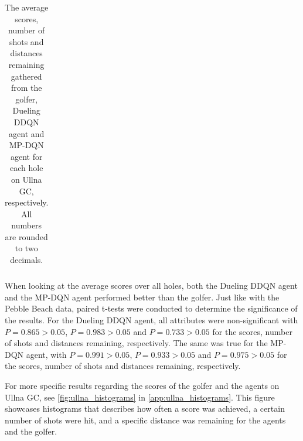 \documentclass{kththesis}
\begin{document}
\begin{table}
\begin{subtable}{0.3\textwidth}
{\begin{tabular}{|c|c|c|c|c|}
    \end{tabular}
    }
    \end{subtable}
    \hfill
    \begin{subtable}{0.3\textwidth}
    \centering
    \end{subtable}
    \caption{The average scores, number of shots and distances remaining gathered from the golfer, Dueling DDQN agent and MP-DQN agent for each hole on Ullna GC, respectively. All numbers are rounded to two decimals.}
    \label{tab:ullna_average_results}
\end{table}

When looking at the average scores over all holes, both the Dueling DDQN agent and the MP-DQN agent performed better than the golfer. Just like with the Pebble Beach data, paired t-tests were conducted to determine the significance of the results. For the Dueling DDQN agent, all attributes were non-significant with $P = 0.865 > 0.05$, $P = 0.983 > 0.05$ and $P = 0.733 > 0.05$ for the scores, number of shots and distances remaining, respectively. The same was true for the MP-DQN agent, with $P = 0.991 > 0.05$, $P = 0.933 > 0.05$ and $P = 0.975 > 0.05$ for the scores, number of shots and distances remaining, respectively.

For more specific results regarding the scores of the golfer and the agents on Ullna GC, see \autoref{fig:ullna_histograms} in \autoref{app:ullna_histograms}. This figure showcases histograms that describes how often a score was achieved, a certain number of shots were hit, and a specific distance was remaining for the agents and the golfer.
\end{document}
